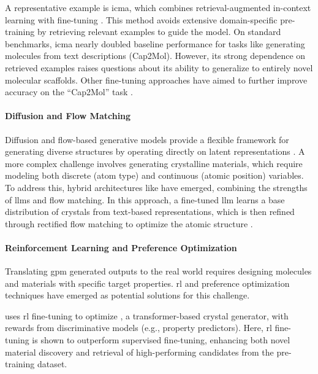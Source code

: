 A representative example is \gls{icma}, which combines retrieval-augmented in-context learning with fine-tuning \autocite{li2025large}. This method avoids extensive domain-specific pre-training by retrieving relevant examples to guide the model. On standard benchmarks, \gls{icma} nearly doubled baseline performance for tasks like generating molecules from text descriptions (Cap2Mol). However, its strong dependence on retrieved examples raises questions about its ability to generalize to entirely novel molecular scaffolds. Other fine-tuning approaches have aimed to further improve accuracy on the  \enquote{Cap2Mol} task \autocite{li2024molreflect, lin2025property}. 

\paragraph{Diffusion and Flow Matching}
Diffusion and flow-based generative models provide a flexible framework for generating diverse structures by operating directly on latent representations \autocite{zhu20243m-diffusion}. A more complex challenge involves generating crystalline materials, which require modeling both discrete (atom type) and continuous (atomic position) variables. To address this, hybrid architectures like  have emerged, combining the strengths of \glspl{llm} and flow matching. In this approach, a fine-tuned \gls{llm} learns a base distribution of crystals from text-based representations, which is then refined through rectified flow matching to optimize the atomic structure \autocite{sriram2024flowllm}.

\paragraph{Reinforcement Learning and Preference Optimization}

Translating \gls{gpm} generated outputs to the real world requires designing molecules and materials with specific target properties. \gls{rl} and preference optimization techniques\autocite{lee2024fine-tuning} have emerged as potential solutions for this challenge. 

 uses \gls{rl} fine-tuning to optimize \autocite{cao2024space}, a transformer-based crystal generator, with rewards from discriminative models (e.g., property predictors)\autocite{cao2025crystalformer-rl}. Here, \gls{rl} fine-tuning is shown to outperform supervised fine-tuning, enhancing both novel material discovery and retrieval of high-performing candidates from the pre-training dataset.

